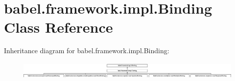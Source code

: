 \hypertarget{classbabel_1_1framework_1_1impl_1_1_binding}{\section{babel.\-framework.\-impl.\-Binding Class Reference}
\label{classbabel_1_1framework_1_1impl_1_1_binding}
}
Inheritance diagram for babel.\-framework.\-impl.\-Binding\-:\begin{figure}[H]
\begin{center}
\leavevmode
\includegraphics[height=0.896000cm]{classbabel_1_1framework_1_1impl_1_1_binding}
\end{center}
\end{figure}
